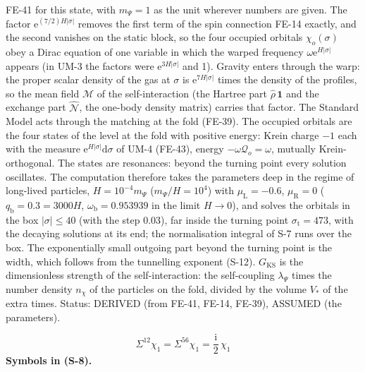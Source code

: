 \documentclass[
  10pt,
]{article}
\begin{document}
FE-41 for this state, with \(m_\Psi = 1\) as the unit wherever numbers
are given. The factor \(\mathrm{e}^{(7/2)H\lvert\sigma\rvert}\) removes
the first term of the spin connection FE-14 exactly, and the second
vanishes on the static block, so the four occupied orbitals
\(\chi_o(\sigma)\) obey a Dirac equation of one variable in which the
warped frequency \(\omega\mathrm{e}^{H\lvert\sigma\rvert}\) appears (in
UM-3 the factors were \(\mathrm{e}^{3H\lvert\sigma\rvert}\) and 1).
Gravity enters through the warp: the proper scalar density of the gas at
\(\sigma\) is \(\mathrm{e}^{7H\lvert\sigma\rvert}\) times the density of
the profiles, so the mean field \(\mathcal{M}\) of the self-interaction
(the Hartree part \(\hat\rho\,\mathbf{1}\) and the exchange part
\(\hat{\mathcal{N}}\), the one-body density matrix) carries that factor.
The Standard Model acts through the matching at the fold (FE-39). The
occupied orbitals are the four states of the level at the fold with
positive energy: Krein charge \(-1\) each with the measure
\(\mathrm{e}^{H\lvert\sigma\rvert}\mathrm{d}\sigma\) of UM-4 (FE-43),
energy \(-\omega\mathcal{Q}_o = \omega\), mutually Krein-orthogonal. The
states are resonances: beyond the turning point every solution
oscillates. The computation therefore takes the parameters deep in the
regime of long-lived particles, \(H = 10^{-4}m_\Psi\)
(\(m_\Psi/H = 10^4\)) with \(\mu_{\mathrm{L}} = -0.6\),
\(\mu_{\mathrm{R}} = 0\) (\(q_{\mathrm{b}} = 0.3 = 3000H\),
\(\omega_{\mathrm{b}} = 0.953939\) in the limit \(H \to 0\)), and solves
the orbitals in the box \(\lvert\sigma\rvert \le 40\) (with the step
0.03), far inside the turning point \(\sigma_{\mathrm{t}} = 473\), with
the decaying solutions at its end; the normalisation integral of S-7
runs over the box. The exponentially small outgoing part beyond the
turning point is the width, which follows from the tunnelling exponent
(S-12). \(G_{\mathrm{KS}}\) is the dimensionless strength of the
self-interaction: the self-coupling \(\lambda_\Psi\) times the number
density \(n_\chi\) of the particles on the fold, divided by the volume
\(V_*\) of the extra times. Status: DERIVED (from FE-41, FE-14, FE-39),
ASSUMED (the parameters).

\[
\Sigma^{12}\chi_1 = \Sigma^{56}\chi_1 = \frac{\mathrm{i}}{2}\,\chi_1 \tag{S-8}
\] \textbf{Symbols in (S-8).}
\end{document}
